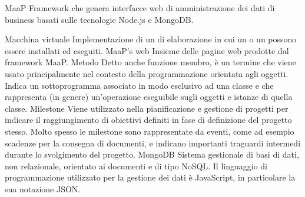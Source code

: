 \elemento
{MaaP}
{Framework che genera interfacce web di amministrazione dei dati di business basati sulle tecnologie Node.js e MongoDB. }

\elemento
{Macchina virtuale} 
{Implementazione  di un  di elaborazione in cui un  o un  possono essere installati ed eseguiti.}
\elemento
{MaaP's web}
{Insieme delle pagine web prodotte dal framework MaaP.}
\elemento
{Metodo}
{Detto anche funzione membro, è un termine che viene usato principalmente nel contesto della programmazione orientata agli oggetti. Indica un sottoprogramma associato in modo esclusivo ad una classe e che rappresenta (in genere) un'operazione eseguibile sugli oggetti e istanze di quella classe.}
\elemento
{Milestone}
{Viene utilizzato nella pianificazione e gestione di progetti per indicare il raggiungimento di obiettivi definiti in fase di definizione del progetto stesso. Molto spesso le milestone sono rappresentate da eventi, come ad esempio scadenze per la consegna di documenti, e indicano importanti traguardi intermedi durante lo svolgimento del progetto.}
\elemento
{MongoDB}
{Sistema gestionale di basi di dati, non relazionale, orientato ai documenti e di tipo NoSQL. Il linguaggio di programmazione utilizzato per la gestione dei dati è JavaScript, in particolare la sua notazione JSON.}
